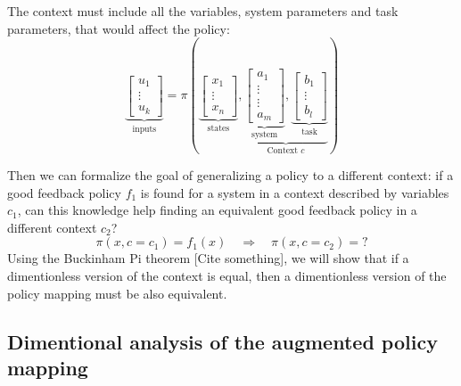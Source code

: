 The context must include all the variables, system parameters and task parameters, that would affect the  policy:
\begin{equation}
\underbrace{\begin{bmatrix}
u_1 \\
\vdots \\
u_k
\end{bmatrix}}_{\text{inputs}}
=
\pi \left(
\underbrace{\begin{bmatrix}
x_1 \\
\vdots \\
x_n
\end{bmatrix}}_{\text{states}}
,
\underbrace{
\underbrace{\begin{bmatrix}
a_1 \\
\vdots \\
\vdots \\
a_m
\end{bmatrix}}_{\text{system}}
,
\underbrace{\begin{bmatrix}
b_1 \\
\vdots \\
b_l
\end{bmatrix}}_{\text{task}}
}_{\text{Context $c$}}
\right) 
\end{equation}

Then we can formalize the goal of generalizing a policy to a different context: if a good feedback policy $f_1$ is found for a system in a context described by variables $c_1$, can this knowledge help finding an equivalent good feedback policy in a different context $c_2$?
\begin{equation}
\pi \left(
x,
c = c_1
\right) = 
f_1 \left(
x 
\right) 
\quad \Rightarrow \quad
\pi \left(
x,
c = c_2
\right) = ?
\end{equation}
Using the Buckinham Pi theorem [Cite something], we will show that if a dimentionless version of the context is equal, then a dimentionless version of the policy mapping must be also equivalent.



\subsection{Dimentional analysis of the augmented policy mapping}

